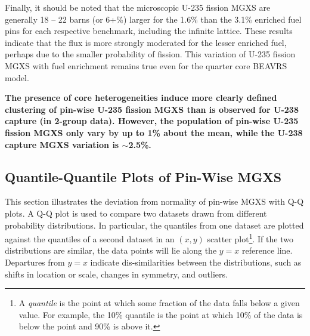 Finally, it should be noted that the microscopic U-235 fission \ac{MGXS} are generally 18 -- 22 barns (or 6+\%) larger for the 1.6\% than the 3.1\% enriched fuel pins for each respective benchmark, including the infinite lattice. These results indicate that the flux is more strongly moderated for the lesser enriched fuel, perhaps due to the smaller probability of fission. This variation of U-235 fission \ac{MGXS} with fuel enrichment remains true even for the quarter core \ac{BEAVRS} model. 

\begin{emphbox}
\textbf{The presence of core heterogeneities induce more clearly defined clustering of pin-wise U-235 fission \ac{MGXS} than is observed for U-238 capture (in 2-group data). However, the population of pin-wise U-235 fission \ac{MGXS} only vary by up to 1\% about the mean, while the U-238 capture \ac{MGXS} variation is $\sim$2.5\%.}
\end{emphbox}

\subsection{Quantile-Quantile Plots of Pin-Wise MGXS}
\label{subsec:chap9-qq-plots}

This section illustrates the deviation from normality of pin-wise \ac{MGXS} with \ac{Q-Q} plots. A \ac{Q-Q} plot is used to compare two datasets drawn from different probability distributions. In particular, the quantiles from one dataset are plotted against the quantiles of a second dataset in an $(x,y)$ scatter plot\footnote{A \textit{quantile} is the point at which some fraction of the data falls below a given value. For example, the 10\% quantile is the point at which 10\% of the data is below the point and 90\% is above it.}. If the two distributions are similar, the data points will lie along the $y = x$ reference line. Departures from $y = x$ indicate dis-similarities between the distributions, such as shifts in location or scale, changes in symmetry, and outliers. 


